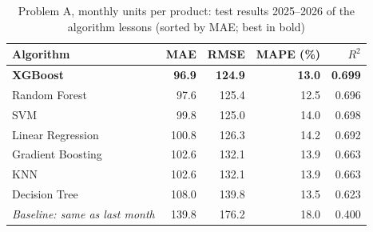\begin{table}[htbp]\centering\small
\caption{Problem A, monthly units per product: test results 2025--2026 of the algorithm lessons (sorted by MAE; best in bold)}\label{tab:algoreg}
\begin{tabular}{@{}lrrrr@{}}
\toprule
\textbf{Algorithm} & \textbf{MAE} & \textbf{RMSE} & \textbf{MAPE (\%)} & \textbf{$R^2$} \\ \midrule
\textbf{XGBoost} & \textbf{96.9} & \textbf{124.9} & \textbf{13.0} & \textbf{0.699} \\
Random Forest & 97.6 & 125.4 & 12.5 & 0.696 \\
SVM & 99.8 & 125.0 & 14.0 & 0.698 \\
Linear Regression & 100.8 & 126.3 & 14.2 & 0.692 \\
Gradient Boosting & 102.6 & 132.1 & 13.9 & 0.663 \\
KNN & 102.6 & 132.1 & 13.9 & 0.663 \\
Decision Tree & 108.0 & 139.8 & 13.5 & 0.623 \\
\midrule
\emph{Baseline: same as last month} & 139.8 & 176.2 & 18.0 & 0.400 \\
\bottomrule
\end{tabular}
\end{table}
